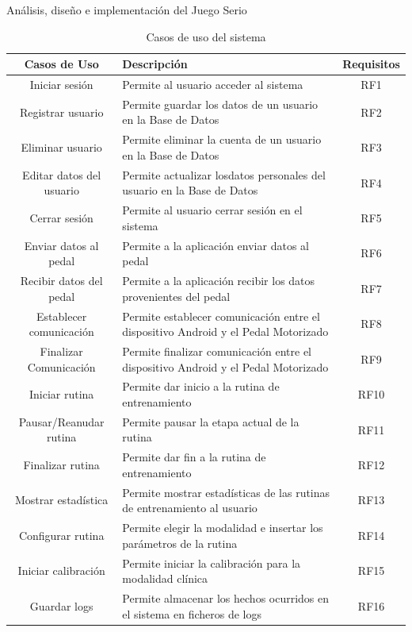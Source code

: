 \begin{thesischapter}{2} {Análisis, diseño e implementación del Juego Serio}
    \begin{table}[h]
        \centering
        \begin{tabularx}{\textwidth}{|c|X|c|}
            \hline
            \textbf{Casos de Uso} & \textbf{Descripción} & \textbf{Requisitos}\\\hline
            Iniciar sesión & Permite al usuario acceder al sistema & RF1\\\hline
            Registrar usuario & Permite guardar los datos de un usuario en la Base de Datos & RF2\\\hline
            Eliminar usuario & Permite eliminar la cuenta de un usuario en la Base de Datos & RF3\\\hline
            Editar datos del usuario & Permite actualizar losdatos personales del usuario en la Base de Datos & RF4\\\hline
            Cerrar sesión & Permite al usuario cerrar sesión en el sistema & RF5\\\hline
            Enviar datos al pedal & Permite a la aplicación enviar datos al pedal & RF6 \\\hline
            Recibir datos del pedal & Permite a la aplicación recibir los datos provenientes del pedal & RF7\\\hline
            Establecer comunicación & Permite establecer comunicación entre el dispositivo Android y el Pedal Motorizado & RF8\\\hline
            Finalizar Comunicación & Permite finalizar comunicación entre el dispositivo Android y el Pedal Motorizado & RF9\\\hline
            Iniciar rutina & Permite dar inicio a la rutina de entrenamiento & RF10\\\hline
            Pausar/Reanudar rutina & Permite pausar la etapa actual de la rutina & RF11\\\hline
            Finalizar rutina & Permite dar fin a la rutina de entrenamiento & RF12\\\hline
            Mostrar estadística & Permite mostrar estadísticas de las rutinas de entrenamiento  al usuario& RF13\\\hline
            Configurar rutina & Permite elegir la modalidad e insertar los parámetros de la rutina  & RF14\\\hline
            Iniciar calibración & Permite iniciar la calibración para la modalidad clínica  & RF15\\\hline
            Guardar logs & Permite almacenar los hechos ocurridos en el sistema en ficheros de logs & RF16\\\hline
        \end{tabularx}
        \label{tab: rf}
        \caption{Casos de uso del sistema}
    \end{table}
    

\end{thesischapter}
